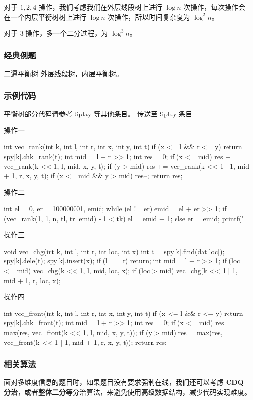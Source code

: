 对于 $1,2,4$ 操作，我们考虑我们在外层线段树上进行 $\log{n}$ 次操作，每次操作会在一个内层平衡树树上进行 $\log{n}$ 次操作，所以时间复杂度为 $\log^2{n}$。

对于 $3$ 操作，多一个二分过程，为 $\log^3{n}$。

\subsubsection{经典例题}

\href{https://www.lydsy.com/JudgeOnline/problem.php?id=3196}{二逼平衡树} 外层线段树，内层平衡树。

\subsubsection{示例代码}

平衡树部分代码请参考 Splay 等其他条目。 传送至 Splay 条目 

操作一

\begin{cppcode}
int vec_rank(int k, int l, int r, int x, int y, int t) {
  if (x <= l && r <= y) {
    return spy[k].chk_rank(t);
  }
  int mid = l + r >> 1;
  int res = 0;
  if (x <= mid) res += vec_rank(k << 1, l, mid, x, y, t);
  if (y > mid) res += vec_rank(k << 1 | 1, mid + 1, r, x, y, t);
  if (x <= mid && y > mid) res--;
  return res;
}
\end{cppcode}

操作二

\begin{cppcode}
int el = 0, er = 100000001, emid;
while (el != er) {
  emid = el + er >> 1;
  if (vec_rank(1, 1, n, tl, tr, emid) - 1 < tk)
    el = emid + 1;
  else
    er = emid;
}
printf("%
\end{cppcode}

操作三

\begin{cppcode}
void vec_chg(int k, int l, int r, int loc, int x) {
  int t = spy[k].find(dat[loc]);
  spy[k].dele(t);
  spy[k].insert(x);
  if (l == r) return;
  int mid = l + r >> 1;
  if (loc <= mid) vec_chg(k << 1, l, mid, loc, x);
  if (loc > mid) vec_chg(k << 1 | 1, mid + 1, r, loc, x);
}
\end{cppcode}

操作四

\begin{cppcode}
int vec_front(int k, int l, int r, int x, int y, int t) {
  if (x <= l && r <= y) return spy[k].chk_front(t);
  int mid = l + r >> 1;
  int res = 0;
  if (x <= mid) res = max(res, vec_front(k << 1, l, mid, x, y, t));
  if (y > mid) res = max(res, vec_front(k << 1 | 1, mid + 1, r, x, y, t));
  return res;
}
\end{cppcode}

\subsubsection{相关算法}

面对多维度信息的题目时，如果题目没有要求强制在线，我们还可以考虑 \textbf{CDQ 分治}，或者\textbf{整体二分}等分治算法，来避免使用高级数据结构，减少代码实现难度。
